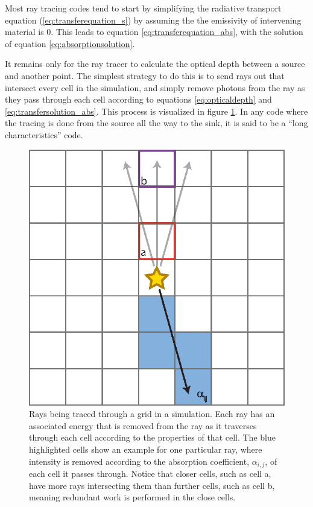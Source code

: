 Most ray tracing codes tend to start by simplifying the radiative transport equation (\ref{eq:transferequation_s}) by assuming the the emissivity of intervening material is 0. This leads to equation \ref{eq:transferequation_abs}, with the solution of equation \ref{eq:absorptionsolution}.

It remains only for the ray tracer to calculate the optical depth between a source and another point. The simplest strategy to do this is to send rays out that intersect every cell in the simulation, and simply remove photons from the ray as they pass through each cell according to equations \ref{eq:opticaldepth} and \ref{eq:transfersolution_abs}. This process is visualized in figure \ref{fig:raytracing}. In any code where the tracing is done from the source all the way to the sink, it is said to be a ``long characteristics'' code.

\begin{figure}
\includegraphics[width=\textwidth]{graphics/ray_flux.eps}
\caption[A visualization of ray tracing.]{Rays being traced through a grid in a simulation. Each ray has an associated energy that is removed from the ray as it traverses through each cell according to the properties of that cell. The blue highlighted cells show an example for one particular ray, where intensity is removed according to the absorption coefficient, $\alpha_{i,j}$, of each cell it passes through. Notice that closer cells, such as cell a, have more rays intersecting them than further cells, such as cell b, meaning redundant work is performed in the close cells.}
\label{fig:raytracing}
\end{figure}

